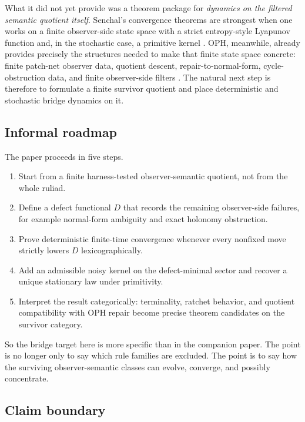 \documentclass[11pt]{article}
\theoremstyle{remark}
\theoremstyle{plain}
\begin{document}
What it did not yet provide was a theorem package for \emph{dynamics on the filtered semantic quotient itself}. Senchal's convergence theorems are strongest when one works on a finite observer-side state space with a strict entropy-style Lyapunov function and, in the stochastic case, a primitive kernel \cite{senchal2025}. OPH, meanwhile, already provides precisely the structures needed to make that finite state space concrete: finite patch-net observer data, quotient descent, repair-to-normal-form, cycle-obstruction data, and finite observer-side filters \cite{ophconsensus,ophsynthesis,ophmicrophysics,muller2026quotients}. The natural next step is therefore to formulate a finite survivor quotient and place deterministic and stochastic bridge dynamics on it.

\subsection{Informal roadmap}

The paper proceeds in five steps.

\begin{enumerate}[leftmargin=2em]
\item Start from a finite harness-tested observer-semantic quotient, not from the whole ruliad.
\item Define a defect functional \(D\) that records the remaining observer-side failures, for example normal-form ambiguity and exact holonomy obstruction.
\item Prove deterministic finite-time convergence whenever every nonfixed move strictly lowers \(D\) lexicographically.
\item Add an admissible noisy kernel on the defect-minimal sector and recover a unique stationary law under primitivity.
\item Interpret the result categorically: terminality, ratchet behavior, and quotient compatibility with OPH repair become precise theorem candidates on the survivor category.
\end{enumerate}

So the bridge target here is more specific than in the companion paper. The point is no longer only to say which rule families are excluded. The point is to say how the surviving observer-semantic classes can evolve, converge, and possibly concentrate.

\subsection{Claim boundary}
\end{document}
